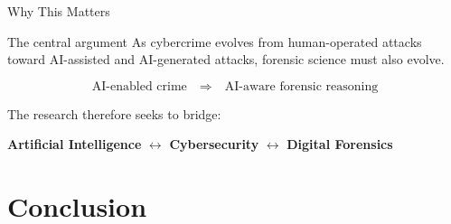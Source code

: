 \documentclass[aspectratio=169,11pt]{beamer}
\begin{document}
	
	\begin{frame}{Why This Matters}
		
		\begin{block}{The central argument}
			As cybercrime evolves from human-operated attacks toward
			AI-assisted and AI-generated attacks, forensic science must
			also evolve.
		\end{block}
		
		\vspace{0.4cm}
		
		\[
		\boxed{
			\text{AI-enabled crime}
			\quad\Longrightarrow\quad
			\text{AI-aware forensic reasoning}
		}
		\]
		
		\vspace{0.5cm}
		
		The research therefore seeks to bridge:
		
		\begin{center}
			
			\textbf{
				Artificial Intelligence
			}
			\quad $\leftrightarrow$ \quad
			\textbf{
				Cybersecurity
			}
			\quad $\leftrightarrow$ \quad
			\textbf{
				Digital Forensics
			}
			
		\end{center}
		
	\end{frame}
	
	
	\section{Conclusion}
	
	
\end{document}
